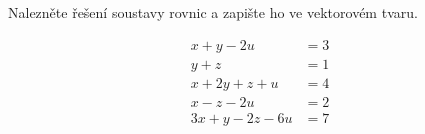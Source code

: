   Nalezněte řešení soustavy rovnic a zapište ho ve vektorovém tvaru.
    
    \begin{align*}
        x+y-2u&=3 \\
        y+z&=1 \\
        x+2y+z+u&=4\\
        x-z-2u&=2\\
        3x+y-2z-6u&=7
    \end{align*}
    
        
